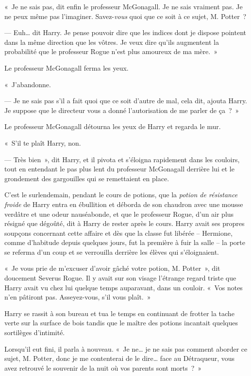 \later

«~Je ne sais pas, dit enfin le professeur McGonagall.
Je ne sais vraiment pas.
Je ne peux même pas l'imaginer.
Savez-\emph{vous} quoi que ce soit à ce sujet, M. Potter~?

--- Euh… dit Harry.
Je pense pouvoir dire que les indices dont je dispose pointent dans la même direction que les vôtres.
Je veux dire qu'ils augmentent la probabilité que le professeur Rogue n'est plus amoureux de ma mère.~»

Le professeur McGonagall ferma les yeux.

«~J'abandonne.

--- Je ne sais pas s'il a fait quoi que ce soit d'autre de mal, cela dit, ajouta Harry.
Je suppose que le directeur vous a donné l'autorisation de me parler de ça~?~»

Le professeur McGonagall détourna les yeux de Harry et regarda le mur.

«~S'il te plaît Harry, non.

--- Très bien~», dit Harry, et il pivota et s'éloigna rapidement dans les couloirs, tout en entendant le pas plus lent du professeur McGonagall derrière lui et le grondement des gargouilles qui se remettaient en place.

\later

C'est le surlendemain, pendant le cours de potions, que la \emph{potion de résistance froide} de Harry entra en ébullition et déborda de son chaudron avec une mousse verdâtre et une odeur nauséabonde, et que le professeur Rogue, d'un air plus résigné que dégoûté, dit à Harry de rester après le cours.
Harry avait ses propres soupçons concernant cette affaire et dès que la classe fut libérée -- Hermione, comme d'habitude depuis quelques jours, fut la première à fuir la salle -- la porte se referma d'un coup et se verrouilla derrière les élèves qui s'éloignaient.

«~Je vous prie de m'excuser d'avoir gâché votre potion, M. Potter~», dit doucement Severus Rogue.
Il y avait sur son visage l'étrange regard triste que Harry avait vu chez lui quelque temps auparavant, dans un couloir.
«~Vos notes n'en pâtiront pas.
Asseyez-vous, s'il vous plaît.~»

Harry se rassit à son bureau et tua le temps en continuant de frotter la tache verte sur la surface de bois tandis que le maître des potions incantait quelques sortilèges d'intimité.

Lorsqu'il eut fini, il parla à nouveau.
«~Je ne… je ne sais pas comment aborder ce sujet, M. Potter, donc je me contenterai de le dire… face au Détraqueur, vous avez retrouvé le souvenir de la nuit où vos parents sont morts~?~»

